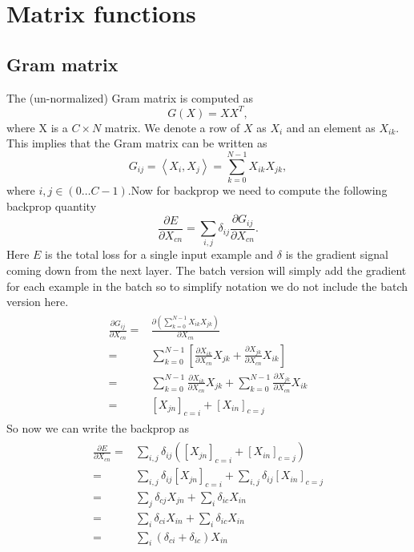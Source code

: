 \documentclass[a4paper]{article}
\begin{document}
\newpage
\section{Matrix functions}
\subsection{Gram matrix}
The (un-normalized) Gram matrix is computed as
\begin{equation}
G(X)=XX^T,
\end{equation}
where X is a $C\times N$ matrix. We denote a row of $X$ as $X_i$ and an element as $X_{ik}$. This implies that the Gram matrix can be written as
\begin{equation}
G_{ij}=\left \langle X_i,X_j \right \rangle = \sum_{k=0}^{N-1} X_{ik} X_{jk},
\end{equation}
where $i,j \in (0\dots C-1)$.Now for backprop we need to compute the following backprop quantity
\begin{equation}
\frac{\partial{E}}{\partial{X_{cn}}} = \sum_{i,j}\delta_{ij} \frac{\partial{G_{ij}}}{\partial{X_{cn}}}.
\end{equation}
Here $E$ is the total loss for a single input example and $\delta$ is the gradient signal coming down from the next layer. The batch version will simply add the gradient for each example in the batch so to simplify notation we do not include the batch version here. 
\begin{align}
\begin{split}
 \frac{\partial{G_{ij}}}{\partial{X_{cn}}} = & \frac{ \partial \left (\sum_{k=0}^{N-1}X_{ik}X_{jk}\right )  }{\partial{X_{cn}}}\\ 
 = & \sum_{k=0}^{N-1} \left [ \frac{\partial{X_{ik}}}{\partial{X_{cn}}} X_{jk} + \frac{\partial{X_{jk}}}{\partial{X_{cn}}} X_{ik} \right ]\\ 
 = & \sum_{k=0}^{N-1} \frac{\partial{X_{ik}}}{\partial{X_{cn}}} X_{jk} + \sum_{k=0}^{N-1} \frac{\partial{X_{jk}}}{\partial{X_{cn}}} X_{ik}\\ 
 = & \left [ X_{jn} \right ]_{c=i} + \left [ X_{in} \right ]_{c=j} 
\end{split}
\end{align}
So now we can write the backprop as
\begin{align}
\begin{split}
 \frac{\partial{E}}{\partial{X_{cn}}}  = &  
 \sum_{i,j} \delta_{ij} \left (\left [ X_{jn} \right ]_{c=i} + \left [ X_{in} \right ]_{c=j} \right )\\ 
  = & \sum_{i,j} \delta_{ij} \left [ X_{jn} \right ]_{c=i} + \sum_{i,j} \delta_{ij} \left [ X_{in} \right ]_{c=j} \\ 
  = &  \sum_{j} \delta_{cj} X_{jn} + \sum_{i} \delta_{ic}  X_{in} \\
  = &  \sum_{i} \delta_{ci} X_{in} + \sum_{i} \delta_{ic}  X_{in} \\
  = &  \sum_{i}  \left ( \delta_{ci}  + \delta_{ic}  \right) X_{in}\\
  \end{split}
\end{align}
\end{document}
